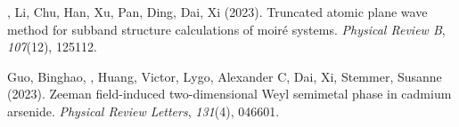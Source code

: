 \begin{etaremune}
\item \Me, Li, Chu, Han, Xu, Pan, Ding, Dai, Xi \CS (2023).
	Truncated atomic plane wave method for subband structure calculations of moiré systems.
	\emph{Physical Review B}, \emph{107}(12), 125112.

\item Guo, Binghao, \Me, Huang, Victor, Lygo, Alexander C, Dai, Xi, Stemmer, Susanne \CS (2023).
	Zeeman field-induced two-dimensional Weyl semimetal phase in cadmium arsenide.
	\emph{Physical Review Letters}, \emph{131}(4), 046601.
\end{etaremune}

